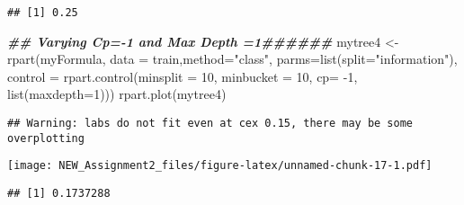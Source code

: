 \documentclass[
]{article}
\newenvironment{Shaded}{\begin{snugshade}}{\end{snugshade}}
\newcommand{\AttributeTok}[1]{\textcolor[rgb]{0.77,0.63,0.00}{#1}}
\newcommand{\DecValTok}[1]{\textcolor[rgb]{0.00,0.00,0.81}{#1}}
\newcommand{\DocumentationTok}[1]{\textcolor[rgb]{0.56,0.35,0.01}{\textbf{\textit{#1}}}}
\newcommand{\FunctionTok}[1]{\textcolor[rgb]{0.00,0.00,0.00}{#1}}
\newcommand{\NormalTok}[1]{#1}
\newcommand{\OtherTok}[1]{\textcolor[rgb]{0.56,0.35,0.01}{#1}}
\newcommand{\SpecialCharTok}[1]{\textcolor[rgb]{0.00,0.00,0.00}{#1}}
\newcommand{\StringTok}[1]{\textcolor[rgb]{0.31,0.60,0.02}{#1}}
\begin{document}
\begin{verbatim}
## [1] 0.25
\end{verbatim}

\begin{Shaded}
\begin{Highlighting}[]
\DocumentationTok{\#\# Varying Cp={-}1 and Max Depth =1\#\#\#\#\#\#}
\NormalTok{mytree4 }\OtherTok{\textless{}{-}} \FunctionTok{rpart}\NormalTok{(myFormula, }
\AttributeTok{data =}\NormalTok{ train,}\AttributeTok{method=}\StringTok{"class"}\NormalTok{, }
\AttributeTok{parms=}\FunctionTok{list}\NormalTok{(}\AttributeTok{split=}\StringTok{"information"}\NormalTok{), }
\AttributeTok{control =} \FunctionTok{rpart.control}\NormalTok{(}\AttributeTok{minsplit =} \DecValTok{10}\NormalTok{, }\AttributeTok{minbucket =} \DecValTok{10}\NormalTok{, }\AttributeTok{cp=} \SpecialCharTok{{-}}\DecValTok{1}\NormalTok{, }
\FunctionTok{list}\NormalTok{(}\AttributeTok{maxdepth=}\DecValTok{1}\NormalTok{)))}
\FunctionTok{rpart.plot}\NormalTok{(mytree4)}
\end{Highlighting}
\end{Shaded}

\begin{verbatim}
## Warning: labs do not fit even at cex 0.15, there may be some overplotting
\end{verbatim}

\texttt{[image: NEW\_Assignment2\_files/figure-latex/unnamed-chunk-17-1.pdf]}

\begin{Shaded}
\end{Shaded}

\begin{verbatim}
## [1] 0.1737288
\end{verbatim}
\end{document}
